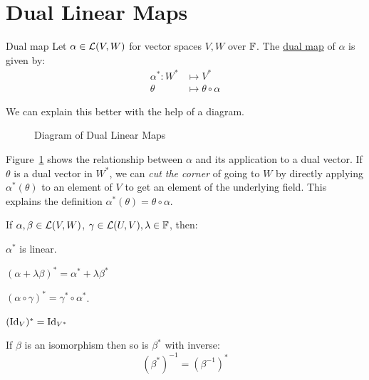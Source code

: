 \documentclass[../Main.tex]{subfiles}
\begin{document}
\section{Dual Linear Maps}
\begin{definition}{Dual map}
    Let $\alpha \in \mathcal{L}(V, W)$ for vector spaces $V, W$ over $\mathbb{F}$. The \underline{dual map} of $\alpha$ is given by:
    \begin{align*}
        \alpha^* : W^* &\mapsto V^*\\
        \theta &\mapsto \theta \circ \alpha
    \end{align*}
\end{definition}
We can explain this better with the help of a diagram.
\begin{figure}
    \centering
    \caption{Diagram of Dual Linear Maps}
    \label{figDLMDiagram}
\end{figure}
Figure~\ref{figDLMDiagram} shows the relationship between $\alpha$ and its application to a dual vector. If $\theta$ is a dual vector in $W^*$, we can \textit{cut the corner} of going to $W$ by directly applying $\alpha^*(\theta)$ to an element of $V$ to get an element of the underlying field. This explains the definition $\alpha^*(\theta) = \theta \circ \alpha$.
\begin{propositions}{
    If $\alpha, \beta \in \mathcal{L}(V, W)$, $\gamma \in \mathcal{L}(U, V), \lambda \in \mathbb{F}$, then:
        \label{propsDLM}
    }
    \item $\alpha^*$ is linear. \label{propDLMLinear}
    \item $(\alpha + \lambda \beta)^* = \alpha^* + \lambda\beta^*$ \label{propDLMLinearOp}
    \item $(\alpha \circ \gamma)^* = \gamma^* \circ \alpha^*$. \label{propDLMSwapsCompose}
    \item $(\operatorname{Id}_V)^* = \operatorname{Id}_{V^*}$ \label{propDLMId}
    \item If $\beta$ is an isomorphism then so is $\beta^*$ with inverse:
        \begin{equation*}
            (\beta^*)^{-1} = (\beta^{-1})^*
        \end{equation*}
        \label{propDLMIsomPreserved}
\end{propositions}
\end{document}
